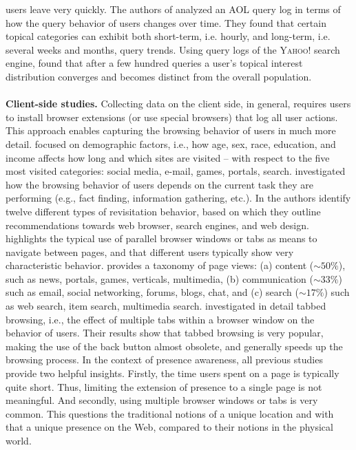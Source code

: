 \documentclass[11pt,fleqn,twoside]{article}
\begin{document}
users leave very quickly. The authors of \cite{Beitzel07TemporalAnalysis} analyzed an \textsc{AOL} query log in terms of how the query behavior of users changes over time. They found that certain topical categories can exhibit both short-term, i.e. hourly, and long-term, i.e. several weeks and months, query trends. Using query logs of the \textsc{Yahoo!} search engine, \cite{Wedig06LargeScaleAnalysis} found that after a few hundred queries a user's topical interest distribution converges and becomes distinct from the overall population. 
\\
\\
\textbf{Client-side studies.}
Collecting data on the client side, in general, requires users to install browser extensions (or use special browsers) that log all user actions. This approach enables capturing the browsing behavior of users in much more detail. \cite{Goel12WhoDoesWhat} focused on demographic factors, i.e., how age, sex, race, education, and income affects how long and which sites are visited -- with respect to the five most visited categories: social media, e-mail, games, portals, search. \cite{Kellar06TheImpact} investigated how the browsing behavior of users depends on the current task they are performing (e.g., fact finding, information gathering, etc.).
In \cite{Adar08LargeScaleAnalysis} the authors identify twelve different types of revisitation behavior, based on which they outline recommendations towards web browser, search engines, and web design. \cite{Weinreich08NotQuite} highlights the typical use of parallel browser windows or tabs as means to navigate between pages, and that different users typically show very characteristic behavior. \cite{Kumar10Kumar} provides a taxonomy of page views: (a) content ($\sim 50\%$), such as news, portals, games, verticals, multimedia, (b) communication ($\sim 33\%$) such as email, social networking, forums, blogs, chat, and (c) search ($\sim 17\%$) such as web search, item search, multimedia search. \cite{Dubroy10AStudyOfTabbed,Zhang11MeasuringWebPage,Huang12NoSearchResult} investigated in detail tabbed browsing, i.e., the effect of multiple tabs within a browser window on the behavior of users. Their results show that tabbed browsing is very popular, making the use of the back button almost obsolete, and generally 
speeds up the browsing process. In the context of presence awareness, all previous studies provide two helpful insights. Firstly, the time users spent on a page is typically quite short. Thus, limiting the extension of presence to a single page is not meaningful. And secondly, using multiple browser windows or tabs is very common. This questions the traditional notions of a unique location and with that a unique presence on the Web, compared to their notions in the physical world.
\end{document}

